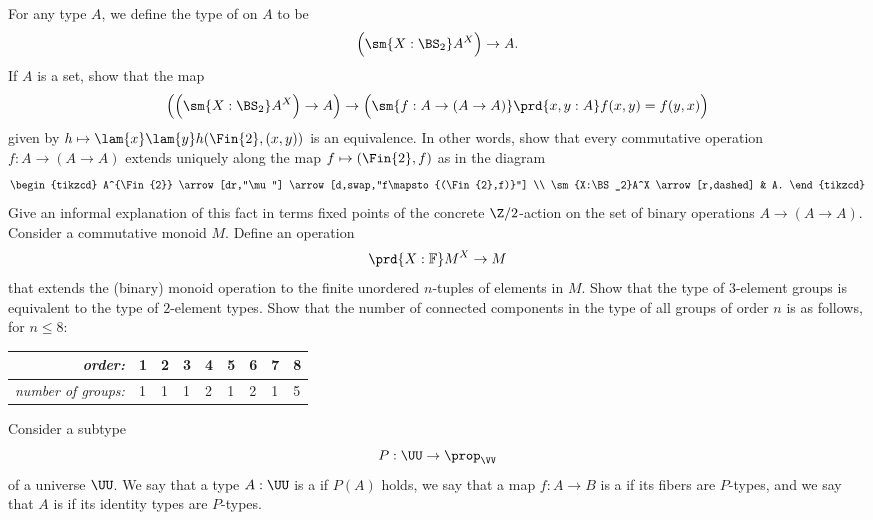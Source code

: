\begin{exercises}
\begin{equation*}
  \end{equation*}
  \exitem \label{ex:commutative-binary-operations}For any type $A$, we define the type of  on $A$ to be
  \begin{equation*}
    \Big(\sm{X:\BS_2}A^X\Big)\to A.
  \end{equation*}
  If $A$ is a set, show that the map
  \begin{equation*}
    \Big(\Big(\sm{X:\BS_2}A^X\Big)\to A\Big)\to\Big(\sm{f:A\to (A\to A)}\prd{x,y:A}f(x,y)=f(y,x)\Big)
  \end{equation*}
  given by $h\mapsto \lam{x}\lam{y}h(\Fin{2},(x,y))$ is an equivalence. In other words, show that every commutative operation $f:A\to(A\to A)$ extends uniquely along the map $f\mapsto(\Fin{2},f)$ as in the diagram
  \begin{equation*}
    \begin{tikzcd}
      A^{\Fin{2}} \arrow[dr,"\mu"] \arrow[d,swap,"f\mapsto{(\Fin{2},f)}"] \\
      \sm{X:\BS_2}A^X \arrow[r,dashed] & A.
    \end{tikzcd}
  \end{equation*}
  Give an informal explanation of this fact in terms fixed points of the concrete $\Z/2$-action on the set of binary operations $A\to (A\to A)$.
  \exitem Consider a commutative monoid $M$. Define an operation
  \begin{equation*}
    \prd{X:\mathbb{F}} M^X\to M
  \end{equation*}
  that extends the (binary) monoid operation to the finite unordered $n$-tuples of elements in $M$.
  \exitem Show that the type of $3$-element groups is equivalent to the type of $2$-element types.
  \exitem Show that the number of connected components in the type of all groups of order $n$ is as follows, for $n\leq 8$:
  \begin{center}
    \begin{tabular}{rllllllll}
      \emph{order:} & 1 & 2 & 3 & 4 & 5 & 6 & 7 & 8 \\
      \midrule
      \emph{number of groups:} & 1 & 1 & 1 & 2 & 1 & 2 & 1 & 5
    \end{tabular}
  \end{center}
  \exitem \label{ex:connected-fundamental}Consider a subtype
  \begin{equation*}
    P:\UU\to\prop_\VV
  \end{equation*}
  of a universe $\UU$. We say that a type $A:\UU$ is a  if $P(A)$ holds, we say that a map $f:A\to B$ is a  if its fibers are $P$-types, and we say that $A$ is  if its identity types are $P$-types.
  

\end{exercises}
